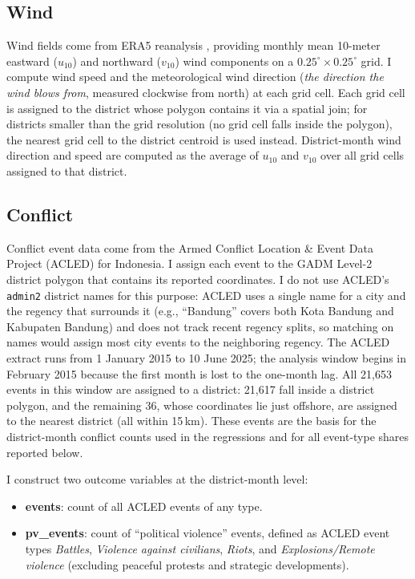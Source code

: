 \documentclass[12pt]{article}
\begin{document}
\subsection{Wind}

Wind fields come from ERA5 reanalysis \citep{hersbach2023era5}, providing monthly mean 10-meter eastward ($u_{10}$) and northward ($v_{10}$) wind components on a $0.25^{\circ}\times0.25^{\circ}$ grid. I compute wind speed and the meteorological wind direction (\emph{the direction the wind blows from}, measured clockwise from north) at each grid cell. Each grid cell is assigned to the district whose polygon contains it via a spatial join; for districts smaller than the grid resolution (no grid cell falls inside the polygon), the nearest grid cell to the district centroid is used instead. District-month wind direction and speed are computed as the average of $u_{10}$ and $v_{10}$ over all grid cells assigned to that district.

\subsection{Conflict}

Conflict event data come from the Armed Conflict Location \& Event Data Project (ACLED) for Indonesia. I assign each event to the GADM Level-2 district polygon that contains its reported coordinates. I do not use ACLED's \texttt{admin2} district names for this purpose: ACLED uses a single name for a city and the regency that surrounds it (e.g., ``Bandung'' covers both Kota Bandung and Kabupaten Bandung) and does not track recent regency splits, so matching on names would assign most city events to the neighboring regency. The ACLED extract runs from 1 January 2015 to 10 June 2025; the analysis window begins in February 2015 because the first month is lost to the one-month lag. All 21{,}653 events in this window are assigned to a district: 21{,}617 fall inside a district polygon, and the remaining 36, whose coordinates lie just offshore, are assigned to the nearest district (all within 15\,km). These events are the basis for the district-month conflict counts used in the regressions and for all event-type shares reported below.

I construct two outcome variables at the district-month level:
\begin{itemize}
    \item \textbf{events}: count of all ACLED events of any type.
    \item \textbf{pv\_events}: count of ``political violence'' events, defined as ACLED event types \emph{Battles}, \emph{Violence against civilians}, \emph{Riots}, and \emph{Explosions/Remote violence} (excluding peaceful protests and strategic developments).
\end{itemize}
\end{document}
